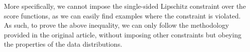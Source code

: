 More specifically, we cannot impose the single-sided Lipschitz constraint over the score functions, as we can easily find examples where the constraint is violated. As such, to prove the above inequality, we can only follow the methodology provided in the original article, without imposing other constraints but obeying the properties of the data distributions.